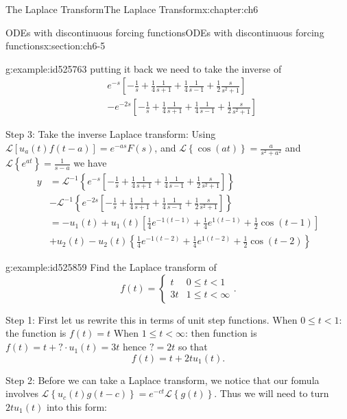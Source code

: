 \documentclass[oneside,10pt,]{book}
\numberwithin{equation}{section}
\numberwithin{equation}{section}
\newcommand{\lt}{<}
\newcommand{\amp}{&}
\begin{document}
\begin{chapterptx}{The Laplace Transform}{}{The Laplace Transform}{}{}{x:chapter:ch6}
\begin{sectionptx}{ODEs with discontinuous forcing functions}{}{ODEs with discontinuous forcing functions}{}{}{x:section:ch6-5}
\begin{example}{}{g:example:id525763}
putting it back we need to take the inverse of%
\begin{align*}
\amp e^{-s}\left[-\frac{1}{s}+\frac{1}{4}\frac{1}{s+1}+\frac{1}{4}\frac{1}{s-1}+\frac{1}{2}\frac{s}{s^{2}+1}\right]\\
\amp -e^{-2s}\left[-\frac{1}{s}+\frac{1}{4}\frac{1}{s+1}+\frac{1}{4}\frac{1}{s-1}+\frac{1}{2}\frac{s}{s^{2}+1}\right]
\end{align*}
%
\par
Step 3: Take the inverse Laplace transform: Using \(\mathcal{L}\left[u_{a}(t)f(t-a)\right]=e^{-as}F(s)\), and \(\mathcal{L}\left\{ \cos(at)\right\} =\frac{a}{s^{2}+a^{2}}\) and \(\mathcal{L}\left\{ e^{at}\right\} =\frac{1}{s-a}\) we have%
\begin{align*}
y \amp =\mathcal{L}^{-1}\left\{ e^{-s}\left[-\frac{1}{s}+\frac{1}{4}\frac{1}{s+1}+\frac{1}{4}\frac{1}{s-1}+\frac{1}{2}\frac{s}{s^{2}+1}\right]\right\} \\
\amp -\mathcal{L}^{-1}\left\{ e^{-2s}\left[-\frac{1}{s}+\frac{1}{4}\frac{1}{s+1}+\frac{1}{4}\frac{1}{s-1}+\frac{1}{2}\frac{s}{s^{2}+1}\right]\right\} \\
\amp =-u_{1}(t)+u_{1}(t)\left[\frac{1}{4}e^{-1\left(t-1\right)}+\frac{1}{4}e^{1\left(t-1\right)}+\frac{1}{2}\cos\left(t-1\right)\right]\\
\amp +u_{2}(t)-u_{2}(t)\left\{ \frac{1}{4}e^{-1\left(t-2\right)}+\frac{1}{4}e^{1\left(t-2\right)}+\frac{1}{2}\cos\left(t-2\right)\right\} 
\end{align*}
%
\end{example}
\begin{example}{}{g:example:id525859}%
Find the Laplace transform of%
\begin{equation*}
f(t)=\begin{cases}
t \amp 0\leq t\lt 1\\
3t \amp 1\leq t\lt\infty
\end{cases}.
\end{equation*}
%
\par
Step 1: First let us rewrite this in terms of unit step functions. When \(0\leq t\lt 1\): the function is \(f(t)=t\) When \(1\leq t\lt \infty\): then function is \(f(t)=t+?\cdot u_{1}(t)=3t\) hence \(?=2t\) so that%
\begin{equation*}
f(t)=t+2tu_{1}(t).
\end{equation*}
%
\par
Step 2: Before we can take a Laplace transform, we notice that our fomula involves \(\mathcal{L}\left\{ u_{c}(t)g\left(t-c\right)\right\} =e^{-ct}\mathcal{L}\left\{ g(t)\right\} \). Thus we will need to turn \(2tu_{1}(t)\) into this form:%

\end{example}
\end{sectionptx}
\end{chapterptx}
\end{document}
